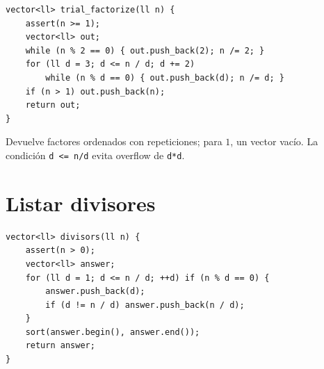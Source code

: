 \begin{lstlisting}[style=cpp]
vector<ll> trial_factorize(ll n) {
    assert(n >= 1);
    vector<ll> out;
    while (n % 2 == 0) { out.push_back(2); n /= 2; }
    for (ll d = 3; d <= n / d; d += 2)
        while (n % d == 0) { out.push_back(d); n /= d; }
    if (n > 1) out.push_back(n);
    return out;
}
\end{lstlisting}

Devuelve factores ordenados con repeticiones; para $1$, un vector vac\'io.
La condici\'on \texttt{d <= n/d} evita overflow de \texttt{d*d}.

\section{Listar divisores}

\begin{lstlisting}[style=cpp]
vector<ll> divisors(ll n) {
    assert(n > 0);
    vector<ll> answer;
    for (ll d = 1; d <= n / d; ++d) if (n % d == 0) {
        answer.push_back(d);
        if (d != n / d) answer.push_back(n / d);
    }
    sort(answer.begin(), answer.end());
    return answer;
}
\end{lstlisting}

